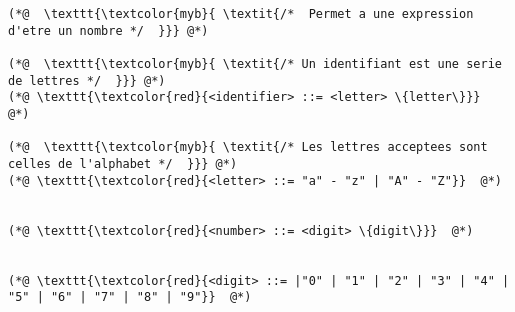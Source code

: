 \documentclass{report}
\begin{document}
\begin{paracol}{2}
\begin{adjustbox}{width=0.66\linewidth}
\begin{lstlisting}
(*@  \texttt{\textcolor{myb}{ \textit{/*  Permet a une expression d'etre un nombre */  }}} @*)

(*@  \texttt{\textcolor{myb}{ \textit{/* Un identifiant est une serie de lettres */  }}} @*)
(*@ \texttt{\textcolor{red}{<identifier> ::= <letter> \{letter\}}}  @*)

(*@  \texttt{\textcolor{myb}{ \textit{/* Les lettres acceptees sont celles de l'alphabet */  }}} @*)
(*@ \texttt{\textcolor{red}{<letter> ::= "a" - "z" | "A" - "Z"}}  @*)


(*@ \texttt{\textcolor{red}{<number> ::= <digit> \{digit\}}}  @*)


(*@ \texttt{\textcolor{red}{<digit> ::= |"0" | "1" | "2" | "3" | "4" | "5" | "6" | "7" | "8" | "9"}}  @*)


\end{lstlisting}






\end{adjustbox}


\switchcolumn

\end{paracol}
\end{document}

